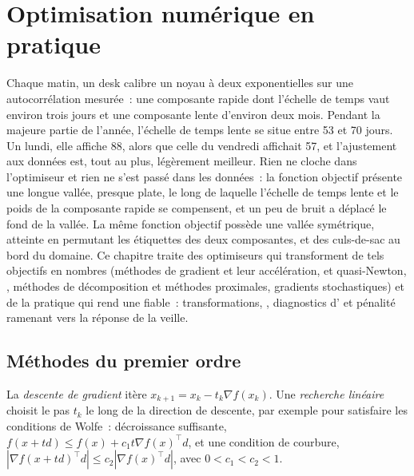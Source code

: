 \chapter{Optimisation numérique en pratique}\label{ch:qm:numerical-optimisation-in-practice}

Chaque matin, un desk calibre un noyau à deux exponentielles sur une autocorrélation mesurée~: une composante rapide dont l'échelle de temps vaut environ trois jours
et une composante lente d'environ deux mois. Pendant la majeure partie de l'année, l'échelle de temps lente se situe entre 53 et 70 jours. Un lundi, elle affiche 88, alors que celle du vendredi
affichait 57, et l'ajustement aux données est, tout au plus, légèrement meilleur. Rien ne cloche dans l'optimiseur et rien ne s'est passé dans les données~: la
fonction objectif présente une longue vallée, presque plate, le long de laquelle l'échelle de temps lente et le poids de la composante rapide se compensent, et un peu de bruit a déplacé le
fond de la vallée. La même fonction objectif possède une vallée symétrique, atteinte en permutant les étiquettes des deux composantes, et des culs-de-sac au
bord du domaine. Ce chapitre traite des optimiseurs qui transforment de tels objectifs en nombres (méthodes de gradient et leur accélération,  et
quasi-Newton, , méthodes de décomposition et méthodes proximales, gradients stochastiques) et de la pratique qui rend une
 fiable~: transformations, , diagnostics d' et pénalité ramenant vers la réponse de la veille.

\section{Méthodes du premier ordre}

\begin{definition}\label{def:qm:numerical-optimisation-in-practice:gd}
La \emph{descente de gradient} itère $x_{k+1} = x_k - t_k\nabla f(x_k)$. Une \emph{recherche linéaire} choisit le pas $t_k$ le long de la
direction de descente, par exemple pour satisfaire les conditions de Wolfe~: décroissance suffisante, $f(x + td) \le f(x) + c_1t\nabla f(x)^\top d$, et une condition de courbure,
$|\nabla f(x + td)^\top d| \le c_2|\nabla f(x)^\top d|$, avec $0 < c_1 < c_2 < 1$.
\end{definition}

